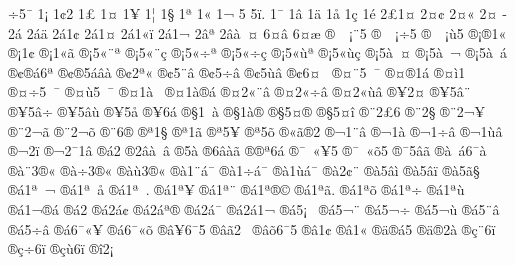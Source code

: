 {^^ad^^f75^^af
^^ad1^^a1
^^ad1^^a22
^^ad1^^a3
^^ad1^^a4
^^ad1^^a5
^^ad1^^a6
^^ad1^^a7
^^ad1^^aa
^^ad1^^ab
^^ad1^^ac
^^ad5^^ad
^^ad5^^ad^^ef.
^^ad1^^af
^^ad1^^e2
^^ad1^^e4
^^ad1^^e5
^^ad1^^e7
^^ad1^^e9
^^ad2^^a31^^a4
^^ad2^^a4^^a2
^^ad2^^a4^^ab
^^ad2^^a4^^ad
^^ad2^^e1^^ad
^^ad2^^e1^^e4
^^ad2^^e11^^a2
^^ad2^^e11^^a4
^^ad2^^e11^^ab^^ef
^^ad2^^e11^^ac
^^ad2^^e2^^aa
^^ad2^^e2^^e0^^a0^^a4
^^ad6^^a4^^e2
^^ad6^^a4^^e6
^^ae^^a0^^ad^^a0^^a1^^a85
^^ae^^a0^^ad^^a0^^a1^^f75
^^ae^^a0^^ad^^a0^^a1^^f95
^^ae^^a1^^ae1^^ab
^^ae^^a11^^a2
^^ae^^a11^^ab^^e3
^^ae^^a15^^ab^^a8^^aa
^^ae^^a15^^ab^^a8^^e7
^^ae^^a15^^ab^^f7^^aa
^^ae^^a15^^ab^^f7^^e7
^^ae^^a15^^ab^^f9^^aa
^^ae^^a15^^ab^^f9^^e7
^^ae^^a15^^e0^^a0^^a4
^^ae^^a15^^e0^^a0^^ac
^^ae^^a15^^e0^^a0^^e1
^^ae^^a2^^ae^^e16^^aa
^^ae^^a2^^ae5^^e1^^e2^^e0
^^ae^^a22^^aa^^ab
^^ae^^a25^^a8^^ad^^e2
^^ae^^a25^^f7^^ad^^e2
^^ae^^a25^^f9^^ad^^e2
^^ae^^a26^^a4^^a0
^^ae^^a4^^a85^^a0^^af
^^ae^^a4^^ae1^^e1
^^ae^^a4^^ec1
^^ae^^a4^^f75^^a0^^af
^^ae^^a4^^f95^^a0^^af
^^ae^^a41^^e0^^a0
^^ae^^a41^^e0^^ae^^e1
^^ae^^a42^^ab^^a8^^e2
^^ae^^a42^^ab^^f7^^e2
^^ae^^a42^^ab^^f9^^e2
^^ae^^a52^^a4
^^ae^^a55^^e2^^a8
^^ae^^a55^^e2^^f7
^^ae^^a55^^e2^^f9
^^ae^^a55^^e5
^^ae^^a56^^e1
^^ae^^a71^^a0^^e0
^^ae^^a71^^e0^^ae
^^ae^^a75^^a4^^ae
^^ae^^a75^^a4^^ee
^^ae^^a82^^a36
^^ae^^a82^^a7
^^ae^^a82^^ac^^a5
^^ae^^a82^^ac^^e3
^^ae^^a82^^ac^^f5
^^ae^^a86^^ae
^^ae^^aa1^^a7
^^ae^^aa1^^ad^^e3
^^ae^^aa5^^ad^^a5
^^ae^^aa5^^ad^^f5
^^ae^^ab^^e3^^ae2
^^ae^^ac1^^a8^^ad^^e2
^^ae^^ac1^^e0
^^ae^^ac1^^f7^^ad^^e2
^^ae^^ac1^^f9^^ad^^e2
^^ae^^ac2^^ad^^ef
^^ae^^ac2^^af1^^e2
^^ae^^ad^^e12
^^ae^^ad2^^e2^^e0^^a0^^e2
^^ae^^ad5^^e0
^^ae^^ad6^^e2^^e0^^e3
^^ae^^ae^^aa6^^e1
^^ae^^af^^a0^^ab^^a55
^^ae^^af^^a0^^ab^^f55
^^ae^^af5^^e2^^e3
^^ae^^e0^^a0^^e16^^af^^e0
^^ae^^e0^^a83^^ae^^ab
^^ae^^e0^^f73^^ae^^ab
^^ae^^e0^^f93^^ae^^ab
^^ae^^e01^^a8^^e1^^af
^^ae^^e01^^f7^^e1^^af
^^ae^^e01^^f9^^e1^^af
^^ae^^e02^^a2^^a8
^^ae^^e05^^e2^^ec
^^ae^^e05^^e2^^ef
^^ae^^e05^^e3^^a7
^^ae^^e11^^aa^^a0^^ac
^^ae^^e11^^aa^^a0^^e5
^^ae^^e11^^aa^^a0.
^^ae^^e11^^aa^^a5
^^ae^^e11^^aa^^a8
^^ae^^e11^^aa^^ae^^a9
^^ae^^e11^^aa^^e3.
^^ae^^e11^^aa^^f5
^^ae^^e11^^aa^^f7
^^ae^^e11^^aa^^f9
^^ae^^e11^^ac^^ae^^e1
^^ae^^e12^^ad
^^ae^^e12^^e1^^a2
^^ae^^e12^^e1^^aa^^ae
^^ae^^e12^^e1^^af
^^ae^^e12^^e11^^ac
^^ae^^e15^^a1^^a0
^^ae^^e15^^ac^^a8
^^ae^^e15^^ac^^f7
^^ae^^e15^^ac^^f9
^^ae^^e15^^ad^^a8^^e2
^^ae^^e15^^ad^^f7^^e2
^^ae^^e16^^af^^ab^^a5
^^ae^^e16^^af^^ab^^f5
^^ae^^e2^^a56^^af5
^^ae^^e2^^e32^^a0
^^ae^^e2^^f56^^af5
^^ae^^e21^^a2
^^ae^^e21^^ab
^^ae^^e4^^ae^^e15
^^ae^^e4^^ae2^^e0
^^ae^^e7^^a86^^ef
^^ae^^e7^^f76^^ef
^^ae^^e7^^f96^^ef
^^ae^^ee2^^a1
}
